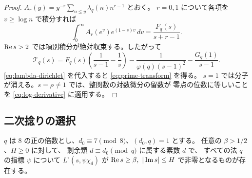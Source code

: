 \begin{proof}
\(A_r(y)=y^{-r}\sum_{n\le y}\lambda_q(n)n^{r-1}\) とおく。
\(r=0,1\) について各項を \(v\ge\log n\) で積分すれば
\[
 \int_0^\infty A_r(e^v)e^{(1-s)v}\,dv=\frac{F_q(s)}{s+r-1}.
\]
\(\operatorname{Re} s>2\) では項別積分が絶対収束する。したがって
\[
 \mathcal T_q(s)
 = F_q(s)\left(\frac1{s-1}-\frac1s\right)
    -\frac1{\varphi(q)(s-1)^2}-\frac{G_q(1)}{s-1}.
\]
\eqref{eq:lambda-dirichlet} を代入すると \eqref{eq:prime-transform} を得る。
\(s=1\) では分子が消える。\(s=\rho\ne1\) では、整関数の対数微分の留数が
零点の位数に等しいことを \eqref{eq:log-derivative} に適用する。
\end{proof}

\subsection{二次捻りの選択}

\begin{lemma}\label{lem:select-quadratic}
\(q\) は \(8\) の正の倍数とし、\(d_0\equiv7\pmod8\)、\((d_0,q)=1\) とする。
任意の \(\beta>1/2\)、\(H\ge0\) に対して、
剰余類 \(d\equiv d_0\pmod q\) に属する素数 \(d\) で、
すべての法 \(q\) の指標 \(\psi\) について \(L^\circ(s,\psi\chi_d)\) が
\(\operatorname{Re} s\ge\beta,\ |\operatorname{Im} s|\le H\) で非零となるものが存在する。
\end{lemma}

